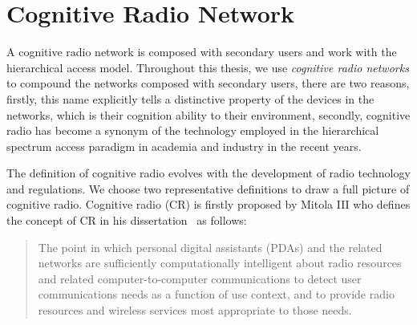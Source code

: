 





\section{Cognitive Radio Network}

A cognitive radio network is composed with secondary users and work with the hierarchical access model.
Throughout this thesis, we use \textit{cognitive radio networks} to compound the networks composed with secondary users, 
there are two reasons, firstly, this name explicitly tells a distinctive property of the devices in the networks, which is their cognition ability to their environment, secondly, cognitive radio has become a synonym of the technology employed in the hierarchical spectrum access paradigm in academia and industry in the recent years.


The definition of cognitive radio evolves with the development of radio technology and regulations.
We choose two representative definitions to draw a full picture of cognitive radio.
Cognitive radio (\gls{CR}) is firstly proposed by Mitola III who defines the concept of CR in his dissertation~\cite{2000mitola_cognitive_radio} as follows:
%
\blockquote{The point in which personal digital assistants (\glspl{PDA}) and the related networks are sufficiently computationally intelligent about radio resources and related computer-to-computer communications to detect user communications needs as a function of use context, and to provide radio resources and wireless services most appropriate to those needs.
}

